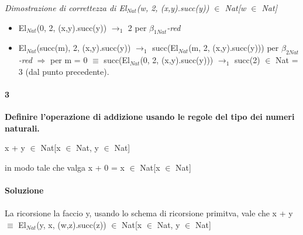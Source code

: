 \small
\begin{adjustwidth}{-5em}{}
\begin{prooftree}
\end{prooftree}
\end{adjustwidth}
\noindent
\normalsize \textit{Dimostrazione di correttezza di El$_{Nat}$(w, 2, (x,y).succ(y)) $\in$ Nat[w $\in$ Nat]}
\begin{itemize}
\item El$_{Nat}$(0, 2, (x,y).succ(y)) $\rightarrow_1$ 2 per \textit{$\beta_{1Nat}$-red}
\item El$_{Nat}$(succ(m), 2, (x,y).succ(y)) $\rightarrow_1$ succ(El$_{Nat}$(m, 2, (x,y).succ(y))) per \textit{$\beta_{2Nat}$-red} $\Rightarrow$ per m = 0 $\equiv$ succ(El$_{Nat}$(0, 2, (x,y).succ(y))) $\rightarrow_1$ succ(2) $\in$ Nat = 3 (dal punto precedente).
\end{itemize}

\paragraph{3}
\textbf{Definire l'operazione di addizione usando le regole del tipo dei numeri naturali.}
\begin{center} x + y $\in$ Nat[x $\in$ Nat, y $\in$ Nat]\end{center}
in modo tale che valga x + 0 = x $\in$  Nat[x $\in$ Nat]
\\\\
\textbf{Soluzione}\\\\
La ricorsione la faccio y, usando lo schema di ricorsione primitva, vale che x + y $\equiv$ El$_{Nat}$(y, x, (w,z).succ(z)) $\in$ Nat[x $\in$ Nat, y $\in$ Nat]


